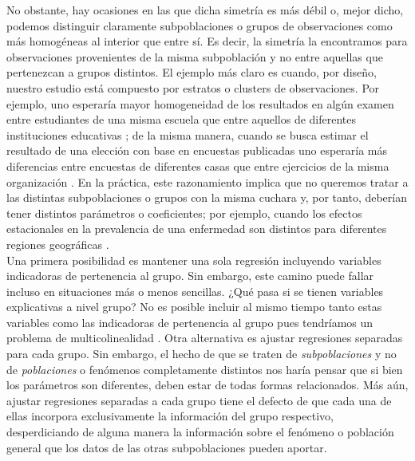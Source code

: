 No obstante, hay ocasiones en las que dicha simetría es más débil o, mejor dicho, podemos distinguir claramente subpoblaciones o grupos de observaciones como más homogéneas al interior que entre sí. Es decir, la simetría la encontramos para observaciones provenientes de la misma subpoblación y no entre aquellas que pertenezcan a grupos distintos. El ejemplo más claro es cuando, por diseño, nuestro estudio está compuesto por estratos o clusters de observaciones. Por ejemplo, uno esperaría mayor homogeneidad de los resultados en algún examen entre estudiantes de una misma escuela que entre aquellos de diferentes instituciones educativas \parencite{Ortiz12}; de la misma manera, cuando se busca estimar el resultado de una elección con base en encuestas publicadas uno esperaría más diferencias entre encuestas de diferentes casas que entre ejercicios de la misma organización \parencite{Zepeda18}. En la práctica, este razonamiento implica que no queremos tratar a las distintas subpoblaciones o grupos con la misma cuchara y, por tanto, deberían tener distintos parámetros o coeficientes; por ejemplo, cuando los efectos estacionales en la prevalencia de una enfermedad son distintos para diferentes regiones geográficas \parencite{Usi14}.\\ 

Una primera posibilidad es mantener una sola regresión incluyendo variables indicadoras de pertenencia al grupo. Sin embargo, este camino puede fallar incluso en situaciones más o menos sencillas. ¿Qué pasa si se tienen variables explicativas a nivel grupo? No es posible incluir al mismo tiempo tanto estas variables como las indicadoras de pertenencia al grupo pues tendríamos un problema de multicolinealidad \parencite[7]{GelmanHill06}. Otra alternativa es ajustar regresiones separadas para cada grupo. Sin embargo, el hecho de que se traten de \textit{subpoblaciones} y no de \textit{poblaciones} o fenómenos completamente distintos nos haría pensar que si bien los parámetros son diferentes, deben estar de todas formas relacionados. Más aún, ajustar regresiones separadas a cada grupo tiene el defecto de que cada una de ellas incorpora exclusivamente la información del grupo respectivo, desperdiciando de alguna manera la información sobre el fenómeno o población general que los datos de las otras subpoblaciones pueden aportar.\\

